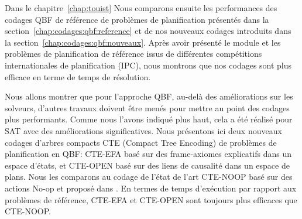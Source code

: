 Dans le chapitre~\ref{chap:touist} 
Nous comparons ensuite les performances des codages QBF de référence de problèmes de planification présentés dans la section~\ref{chap:codages:qbf:reference} et de nos nouveaux codages introduits dans la section~\ref{chap:codages:qbf:nouveaux}. Après avoir présenté le module \touistplan et les problèmes de planification de référence issus de différentes compétitions internationales de planification (IPC), nous montrons que nos codages sont plus efficace en terme de temps de résolution.



Nous allons montrer que pour l'approche QBF, au-delà des améliorations sur les solveurs, d'autres travaux doivent être menés pour mettre au point des codages plus performants. Comme nous l'avons indiqué plus haut, cela a été réalisé pour SAT avec des améliorations significatives. Nous présentons ici deux nouveaux codages d'arbres compacts CTE (Compact Tree Encoding) de problèmes de planification en QBF: CTE-EFA basé sur des frame-axiomes explicatifs dans un espace d'états, et CTE-OPEN basé sur des liens de causalité dans un espace de plans.  Nous les comparons au codage de l'état de l'art CTE-NOOP basé sur des actions No-op et proposé dans \cite{DBLP:conf/ecai/CashmoreFG12}. En termes de temps d'exécution par rapport aux problèmes de référence, CTE-EFA et CTE-OPEN sont toujours plus efficaces que CTE-NOOP.